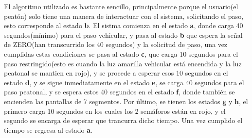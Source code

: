 \documentclass{article}
\begin{document}
El algoritmo utilizado es bastante sencillo, principalmente porque el usuario(el peatón)
solo tiene una manera de interactuar con el sistema, solicitando el paso, esto
corresponde al estado \textbf{b}. El sistma comienza en el estado \textbf{a}, donde
carga 40 segundos(mínimo) para el paso vehicular, y pasa al estado \textbf{b} que
espera la señal de ZERO(han transcurrido los 40 segundos) y la solicitud de paso,
una vez cumplidas estas condiciones se pasa al estado \textbf{c}, que carga 10
segundos para el paso restringido(esto es cuando la luz amarilla vehicular está
encendida y la luz peatonal se mantien en rojo), y se procede a esperar esos 10
segundos en el estado \textbf{d}, y se sigue inmediatamente en el estado \textbf{e},
se carga 40 segundos para el paso peatonal, y se espera estos 40 segundos en el
estado \textbf{f}, donde también se encienden las pantallas de 7 segmentos.
Por último, se tienen los estados \textbf{g} y \textbf{h}, el primero carga 10
segundos en los cuales los 2 semáforos están en rojo, y el segundo se encarga de
esperar que trancurra dicho tiempo. Una vez cumplido el tiempo se regresa al estado
\textbf{a}.
\end{document}
